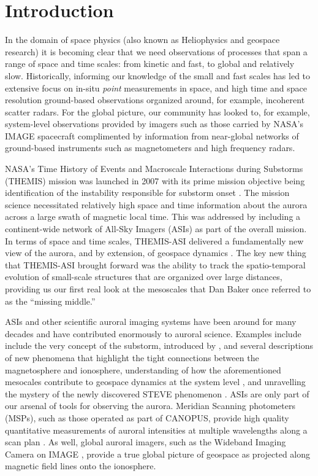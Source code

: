 \documentclass[utf8]{FrontiersinHarvard} %
\begin{document}
\section{Introduction}\label{intro}
In the domain of space physics (also known as Heliophysics and geospace research) it is becoming clear that we need observations of processes that span a range of space and time scales: from kinetic and fast, to global and relatively slow. Historically, informing our knowledge of the small and fast scales has led to extensive focus on in-situ \textit{point} measurements in space, and high time and space resolution ground-based observations organized around, for example, incoherent scatter radars. For the global picture, our community has looked to, for example, system-level observations provided by imagers such as those carried by NASA's IMAGE spacecraft \citep{Burch2000} complimented by information from near-global networks of ground-based instruments such as magnetometers and high frequency radars.

NASA's Time History of Events and Macroscale Interactions during Substorms (THEMIS) mission was launched in 2007 with its prime mission objective being identification of the instability responsible for substorm onset \cite[e.g.][]{Angelopoulos2008}. The mission science necessitated relatively high space and time information about the aurora across a large swath of magnetic local time. This was addressed by including a continent-wide network of All-Sky Imagers (ASIs) as part of the overall mission. In terms of space and time scales, THEMIS-ASI delivered a fundamentally new view of the aurora, and by extension, of geospace dynamics \cite[e.g.][]{Donovan2006a, Mende2009, Jones2013}. The key new thing that THEMIS-ASI brought forward was the ability to track the spatio-temporal evolution of small-scale structures that are organized over large distances, providing us our first real look at the mesoscales that Dan Baker once referred to as the ``missing middle.''

ASIs and other scientific auroral imaging systems have been around for many decades and have contributed enormously to auroral science. Examples include include the very concept of the substorm, introduced by \citet{Akasofu1964}, and several descriptions of new phenomena that highlight the tight connections between the magnetosphere and ionosphere, understanding of how the aforementioned mesocales contribute to geospace dynamics at the system level \citep{Nishimura2010}, and unravelling the mystery of the newly discovered STEVE phenomenon \citep{Macdonald2018}. ASIs are only part of our arsenal of tools for observing the aurora. Meridian Scanning photometers (MSPs), such as those operated as part of CANOPUS, provide high quality quantitative measurements of auroral intensities at multiple wavelengths along a scan plan \citep[e.g.][]{Rostoker1995}. As well, global auroral imagers, such as the Wideband Imaging Camera on IMAGE \citep{Burch2000}, provide a true global picture of geospace as projected along magnetic field lines onto the ionosphere.
\end{document}

